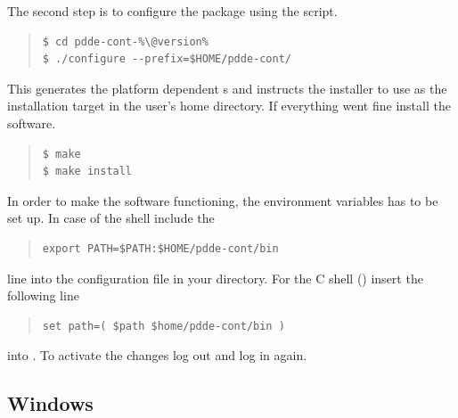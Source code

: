 \documentclass[10pt,a4paper]{ddedoc}
\begin{document}
The second step is to configure the package using the  script.
{ \small \begin{quote} \begin{lstlisting}[basicstyle=\tt,frame=single]
$ cd pdde-cont-%\@version%
$ ./configure --prefix=$HOME/pdde-cont/
\end{lstlisting} \end{quote} } \noindent
This generates the platform dependent s and instructs the installer to use  as the installation target in the user's home directory. If everything went fine install the software.
{ \small \begin{quote} \begin{lstlisting}[basicstyle=\tt,frame=single]
$ make
$ make install
\end{lstlisting} \end{quote} } \noindent
In order to make the software functioning, the  environment variables has to be set up. In case of the  shell include the
{ \small \begin{quote} \begin{lstlisting}[basicstyle=\tt,frame=single]
export PATH=$PATH:$HOME/pdde-cont/bin
\end{lstlisting} \end{quote} } \noindent
line into the  configuration file in your  directory. For the C shell () insert the following line
{ \small \begin{quote} \begin{lstlisting}[basicstyle=\tt,frame=single]
set path=( $path $home/pdde-cont/bin )
\end{lstlisting} \end{quote} } \noindent
into . To activate the changes log out and log in again.

\subsection{Windows}
\end{document}
